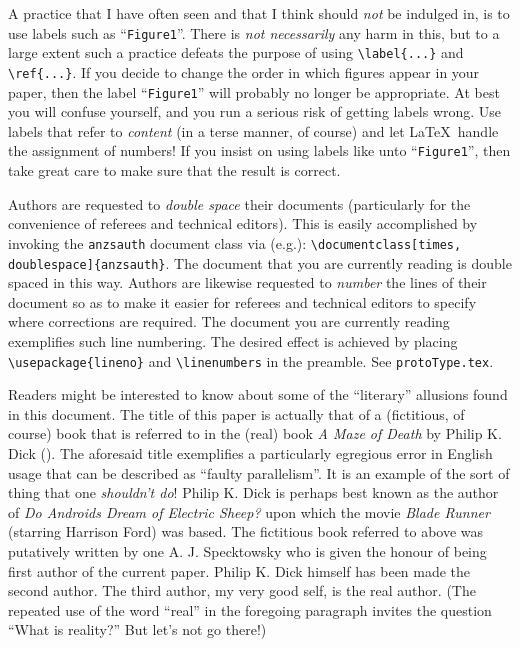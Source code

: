 \documentclass[times, doublespace]{anzsauth}
\begin{document}
A practice that I have often seen and that I think should \emph{not}
be indulged in, is to use labels such as ``\texttt{Figure1}''.  There
is \emph{not necessarily} any harm in this, but to a large extent
such a practice defeats the purpose of using \verb!\label{...}! and
\verb!\ref{...}!.  If you decide to change the order in which
figures appear in your paper, then the label ``\texttt{Figure1}''
will probably no longer be appropriate.  At best you will confuse
yourself, and you run a serious risk of getting labels wrong.
Use labels that refer to \emph{content} (in a terse manner, of
course) and let \LaTeX\ handle the assignment of numbers!  If you
insist on using labels like unto ``\texttt{Figure1}'',
then take great care to make sure that the result is correct.

Authors are requested to \emph{double space} their documents
(particularly for the convenience of referees and technical
editors).  This is easily accomplished by invoking the
\texttt{anzsauth} document class via (e.g.): \label{pg:dsln}
\verb!\documentclass[times, doublespace]{anzsauth}!.  The document
that you are currently reading is double spaced in this way.
Authors are likewise requested to \emph{number} the lines of their
document so as to make it easier for referees and technical editors
to specify where corrections are required.  The document you are
currently reading exemplifies such line numbering.  The desired
effect is achieved by placing \verb!\usepackage{lineno}! and
\verb!\linenumbers!  in the preamble.  See \texttt{protoType.tex}.

Readers might be interested to know about some of the ``literary''
allusions found in this document.  The title of this paper
is actually that of a (fictitious, of course) book that is
referred to in the (real) book \textit{A Maze of Death} by Philip
K. Dick (\citeyear{Dick1971}).  The aforesaid title exemplifies a
particularly egregious error in English usage that can be described
as ``faulty parallelism''.  It is an example of the sort of thing
that one \emph{shouldn't do}!  Philip K. Dick is perhaps best
known as the author of \textit{Do Androids Dream of Electric Sheep?}
\citep{Dick1968} upon which the movie \textit{Blade Runner} (starring
Harrison Ford) was based.  The fictitious book referred to above was
putatively written by one A. J. Specktowsky who is given the honour
of being first author of the current paper.  Philip K. Dick himself
has been made the second author.  The third author, my very good
self, is the real author.  (The repeated use of the word ``real''
in the foregoing paragraph invites the question ``What is reality?''
But let's not go there!)
\end{document}

